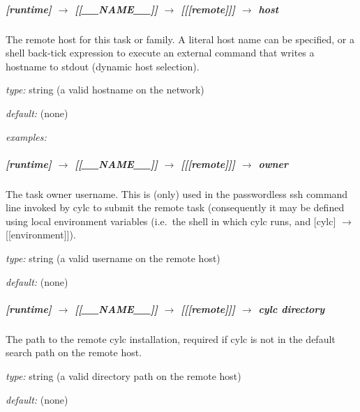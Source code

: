\subparagraph[host]{[runtime] $\rightarrow$ [[\_\_NAME\_\_]] $\rightarrow$ [[[remote]]] $\rightarrow$ host}

\label{DynamicHostSelection}
The remote host for this task or family. A literal host name can be
specified, or a shell back-tick expression to execute an external
command that writes a hostname to stdout (dynamic host selection).

\begin{myitemize}
\item {\em type:} string (a valid hostname on the network)
\item {\em default:} (none)
\item {\em examples:}
\end{myitemize}

\subparagraph[owner]{[runtime] $\rightarrow$ [[\_\_NAME\_\_]] $\rightarrow$ [[[remote]]] $\rightarrow$ owner}

The task owner username. This is (only) used in the passwordless ssh
command line  invoked by cylc to submit the remote task (consequently it
may be defined using local environment variables 
(i.e.\ the shell in which cylc runs, and [cylc] $\rightarrow$ [[environment]]). 

\begin{myitemize}
\item {\em type:} string (a valid username on the remote host)
\item {\em default:} (none)
\end{myitemize}

\subparagraph[cylc directory]{[runtime] $\rightarrow$ [[\_\_NAME\_\_]] $\rightarrow$ [[[remote]]] $\rightarrow$ cylc directory}

The path to the remote cylc installation, required if cylc
is not in the default search path on the remote host.

\begin{myitemize}
\item {\em type:} string (a valid directory path on the remote host)
\item {\em default:} (none)
\end{myitemize}

